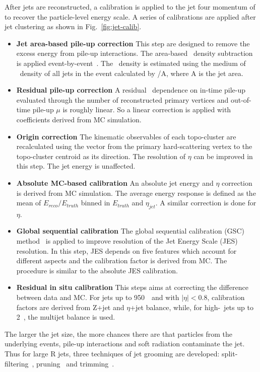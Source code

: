 \par After jets are reconstructed, a calibration is applied to the jet four momentum of to recover the particle-level energy scale.
A series of calibrations are applied after jet clustering as shown in Fig.~\ref{fig:jet-calib}.

\begin{itemize}
    \item \textbf{Jet area-based pile-up correction} This step are designed to remove the excess energy from pile-up interactions. The area-based \pt~density subtraction is applied event-by-event~\cite{Cacciari:2007fd}. The \pt~density is estimated using the medium of \pt~density of all jets in the event calculated by \pt/A, where A is the jet area.
    \item \textbf{Residual pile-up correction} A residual \pt~dependence on in-time pile-up evaluated through the number of reconstructed primary vertices and out-of-time pile-up $\mu$ is roughly linear. So a linear correction is applied with coefficients derived from MC simulation. 
    \item \textbf{Origin correction} The kinematic observables of each topo-cluster are recalculated using the vector from the primary hard-scattering vertex to the topo-cluster centroid as its direction. The resolution of $\eta$ can be improved in this step. The jet energy is unaffected.
    \item \textbf{Absolute MC-based calibration} An absolute jet energy and $\eta$ correction is derived from MC simulation. The average energy response is defined as the mean of $E_{reco}/E_{truth}$ binned in $E_{truth}$ and $\eta_{jet}$. A similar correction is done for $\eta$.
    \item \textbf{Global sequential calibration} The global sequential calibration (GSC) method~\cite{Aad:2011he} is applied to improve resolution of the Jet Energy Scale (JES) resolution. In this step, JES depends on five features which account for different aspects and the calibration factor is derived from MC. The procedure is similar to the absolute JES calibration.
    \item \textbf{Residual in situ calibration} This steps aims at correcting the difference between data and MC. For jets up to 950~\GeV~and with $|\eta| < 0.8$, calibration factors are derived from Z+jet and $\eta$+jet balance, while, for high-\pt~jets up to 2~\TeV, the multijet balance is used.
\end{itemize}

\par The larger the jet size, the more chances there are that particles from the underlying events, pile-up interactions and soft radiation contaminate the jet. Thus for large R jets, three techniques of jet grooming are developed:
split-filtering~\cite{Butterworth:2008iy}, pruning~\cite{Ellis:2009me} and trimming~\cite{Krohn:2009th}. 

